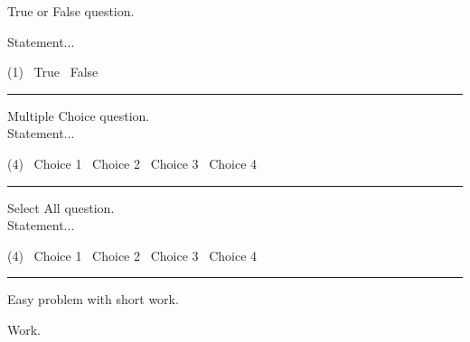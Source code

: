\begin{question}{2}
  \label{question:true-false}
  True or False question. \\
  \begin{minipage}{0.85\textwidth}
    Statement...
  \end{minipage}%
  \begin{minipage}{0.15\textwidth}
    \begin{tasks}(1)
      \task[\choice] \ True
      \task[\correctchoice] \ False
    \end{tasks}
  \end{minipage}
\end{question}

\noindent\rule{\textwidth}{1pt}

\begin{question}{3}
  \label{question:multiple-choice}
  Multiple Choice question. \\
  Statement...
\end{question}
\begin{tasks}(4)
  \task[\choice] \ Choice 1
  \task[\correctchoice] \ Choice 2
  \task[\choice] \ Choice 3
  \task[\choice] \ Choice 4
\end{tasks}

\noindent\rule{\textwidth}{1pt}

\begin{question}{3}
  \label{question:select-all}
  Select All question. \\
  Statement...
\end{question}
\begin{tasks}(4)
  \task[\selectall] \ Choice 1
  \task[\correctselectall] \ Choice 2
  \task[\selectall] \ Choice 3
  \task[\selectall] \ Choice 4
\end{tasks}

\noindent\rule{\textwidth}{1pt}

\begin{question}{3}
  \label{question:easy-problem}
  Easy problem with short work.
\end{question}
\begin{minipage}{0.75\textwidth}
  \begin{solution}
    Work.
  \end{solution}
\end{minipage}\hspace{\fill}%
\begin{minipage}{0.25\textwidth}
  \vspace{0.1in}
\end{minipage}


